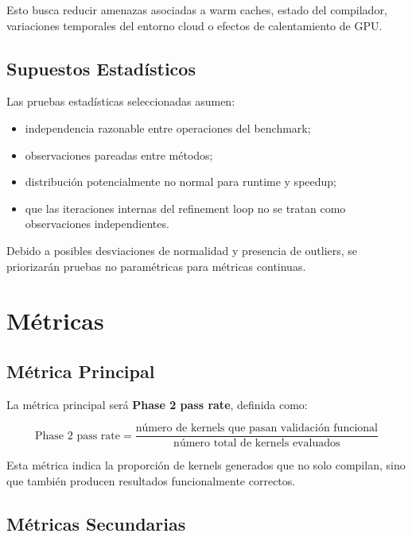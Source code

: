 \documentclass[12pt]{article}
\begin{document}
Esto busca reducir amenazas asociadas a warm caches, estado del compilador, variaciones temporales del entorno cloud o efectos de calentamiento de GPU.

\subsection{Supuestos Estadísticos}

Las pruebas estadísticas seleccionadas asumen:

\begin{itemize}
    \item independencia razonable entre operaciones del benchmark;
    \item observaciones pareadas entre métodos;
    \item distribución potencialmente no normal para runtime y speedup;
    \item que las iteraciones internas del refinement loop no se tratan como observaciones independientes.
\end{itemize}

Debido a posibles desviaciones de normalidad y presencia de outliers, se priorizarán pruebas no paramétricas para métricas continuas.

\section{Métricas}

\subsection{Métrica Principal}

La métrica principal será \textbf{Phase 2 pass rate}, definida como:

\[
\text{Phase 2 pass rate} =
\frac{\text{número de kernels que pasan validación funcional}}{\text{número total de kernels evaluados}}
\]

Esta métrica indica la proporción de kernels generados que no solo compilan, sino que también producen resultados funcionalmente correctos.

\subsection{Métricas Secundarias}
\end{document}
